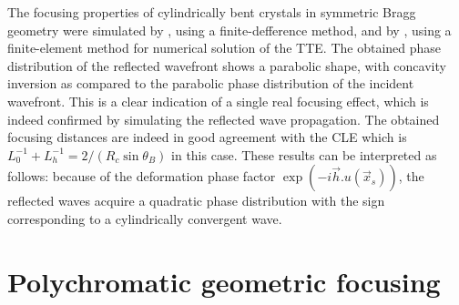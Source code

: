 \documentclass[preprint]{iucr}              %
\begin{document}
The focusing properties of cylindrically bent crystals in symmetric Bragg geometry were simulated by \cite{sutter2010}, using a finite-defference method, and by \cite{honkanen2017, Honkanen2018}, using a finite-element method for numerical solution of the TTE. The obtained phase distribution of the reflected wavefront shows a parabolic shape, with concavity inversion as compared to the parabolic phase distribution of the incident wavefront. This is a clear indication of a single real focusing effect, which is indeed confirmed by simulating the reflected wave propagation. The obtained focusing distances are indeed in good agreement with the CLE which is $L_0^{-1}+L_h^{-1}=2/(R_c \sin\theta_B)$ in this case.
These results can be interpreted as follows: because of the deformation phase factor $\exp(-i\vec h. u(\vec x_s))$, the reflected waves acquire a quadratic phase distribution with the sign corresponding to a cylindrically convergent wave.



\section{Polychromatic geometric focusing}
\label{sec:polychromatic}
%
\end{document}
